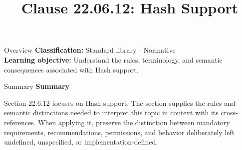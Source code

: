 \documentclass[10pt,letterpaper]{article}
\title{Clause 22.06.12: Hash Support}
\author{}
\date{}
\begin{document}
\maketitle
\begin{CornellOverviewBox}{Overview}
\textbf{Classification:} Standard library - Normative\\[2pt]
\textbf{Learning objective:} Understand the rules, terminology, and semantic consequences associated with Hash support.
\end{CornellOverviewBox}\begin{CornellSummaryBox}{Summary}
{\sffamily\bfseries\color{Accent} Summary}\par\vspace{3pt}Section 22.6.12 focuses on Hash support. The section supplies the rules and semantic distinctions needed to interpret this topic in context with its cross-references. When applying it, preserve the distinction between mandatory requirements, recommendations, permissions, and behavior deliberately left undefined, unspecified, or implementation-defined.
\end{CornellSummaryBox}
\end{document}
